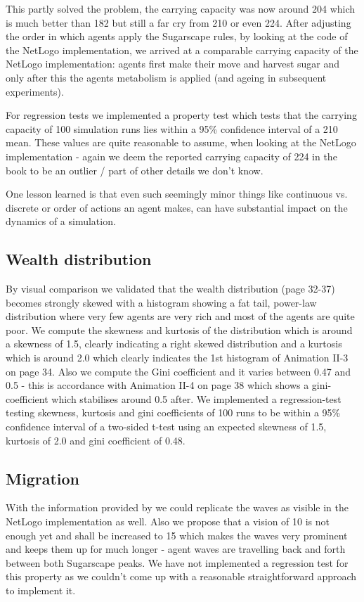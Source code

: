 This partly solved the problem, the carrying capacity was now around 204 which is much better than 182 but still a far cry from 210 or even 224. After adjusting the order in which agents apply the Sugarscape rules, by looking at the code of the NetLogo implementation, we arrived at a comparable carrying capacity of the NetLogo implementation: agents first make their move and harvest sugar and only after this the agents metabolism is applied (and ageing in subsequent experiments).

For regression tests we implemented a property test which tests that the carrying capacity of 100 simulation runs lies within a 95\% confidence interval of a 210 mean. These values are quite reasonable to assume, when looking at the NetLogo implementation - again we deem the reported carrying capacity of 224 in the book to be an outlier / part of other details we don't know.

One lesson learned is that even such seemingly minor things like continuous vs. discrete or order of actions an agent makes, can have substantial impact on the dynamics of a simulation.

\subsection{Wealth distribution}
By visual comparison we validated that the wealth distribution (page 32-37) becomes strongly skewed with a histogram showing a fat tail, power-law distribution where very few agents are very rich and most of the agents are quite poor. We compute the skewness and kurtosis of the distribution which is around a skewness of 1.5, clearly indicating a right skewed distribution and a kurtosis which is around 2.0 which clearly indicates the 1st histogram of Animation II-3 on page 34. Also we compute the Gini coefficient and it varies between 0.47 and 0.5 - this is accordance with Animation II-4 on page 38 which shows a gini-coefficient which stabilises around 0.5 after. 
We implemented a regression-test testing skewness, kurtosis and gini coefficients of 100 runs to be within a 95\% confidence interval of a two-sided t-test using an expected skewness of 1.5, kurtosis of 2.0 and gini coefficient of 0.48.

\subsection{Migration}
With the information provided by \cite{weaver_replicating_2009} we could replicate the waves as visible in the NetLogo implementation as well. Also we propose that a vision of 10 is not enough yet and shall be increased to 15 which makes the waves very prominent and keeps them up for much longer - agent waves are travelling back and forth between both Sugarscape peaks. We have not implemented a regression test for this property as we couldn't come up with a reasonable straightforward approach to implement it.

